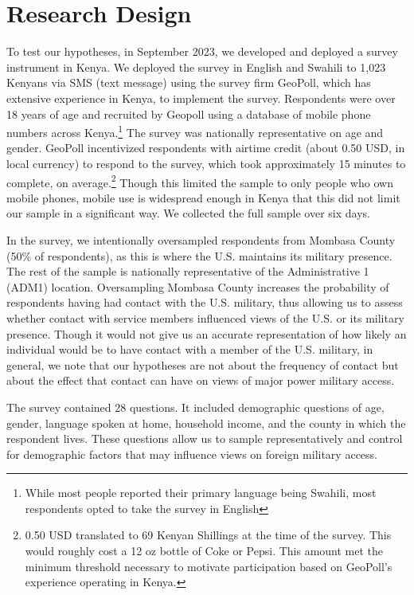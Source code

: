 \section*{Research Design}

To test our hypotheses, in September 2023, we developed and deployed a survey instrument in Kenya. We deployed the survey in English and Swahili to 1,023 Kenyans via SMS (text message) using the survey firm GeoPoll, which has extensive experience in Kenya, to implement the survey. Respondents were over 18 years of age and recruited by Geopoll using a database of mobile phone numbers across Kenya.\footnote{While most people reported their primary language being Swahili, most respondents opted to take the survey in English} The survey was nationally representative on age and gender. GeoPoll incentivized respondents with airtime credit (about 0.50 USD, in local currency) to respond to the survey, which took approximately 15 minutes to complete, on average.\footnote{0.50 USD translated to 69 Kenyan Shillings at the time of the survey. This would roughly cost a 12 oz bottle of Coke or Pepsi. This amount met the minimum threshold necessary to motivate participation based on GeoPoll's experience operating in Kenya.} Though this limited the sample to only people who own mobile phones, mobile use is widespread enough in Kenya that this did not limit our sample in a significant way. We collected the full sample over six days.  

In the survey, we intentionally oversampled respondents from Mombasa County (50\% of respondents), as this is where the U.S. maintains its military presence. The rest of the sample is nationally representative of the Administrative 1 (ADM1) location. Oversampling Mombasa County increases the probability of respondents having had contact with the U.S. military, thus allowing us to assess whether contact with service members influenced views of the U.S. or its military presence. Though it would not give us an accurate representation of how likely an individual would be to have contact with a member of the U.S. military, in general, we note that our hypotheses are not about the frequency of contact but about the effect that contact can have on views of major power military access. 

The survey contained 28 questions. It included demographic questions of age, gender, language spoken at home, household income, and the county in which the respondent lives. These questions allow us to sample representatively and control for demographic factors that may influence views on foreign military access.

